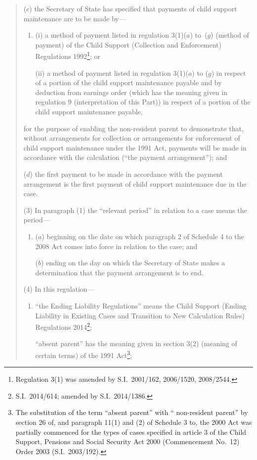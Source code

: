 \documentclass[12pt,a4paper]{article}
\begin{document}
\begin{quotation}
\begin{enumerate}
    ($c$)
    the Secretary of State has specified that payments of child support maintenance are to be made by—
\begin{enumerate}\item[]
    (i)
    a method of payment listed in regulation 3(1)($a$) to~($g$) (method of payment) of the Child Support (Collection and Enforcement) Regulations 1992\footnote{Regulation 3(1) was amended by S.I.~2001/162, 2006/1520, 2008/2544.}; or

    (ii)
    a method of payment listed in regulation 3(1)($a$) to ($g$) in respect of a portion of the child support maintenance payable and by deduction from earnings order (which has the meaning given in regulation 9 (interpretation of this Part)) in respect of a portion of the child support maintenance payable,
\end{enumerate}
    for the purpose of enabling the non-resident parent to demonstrate that, without arrangements for collection or arrangements for enforcement of child support maintenance under the 1991 Act, payments will be made in accordance with the calculation (“the payment arrangement”); and

    ($d$)
    the first payment to be made in accordance with the payment arrangement is the first payment of child support maintenance due in the case.
\end{enumerate}

    (3)
    In paragraph (1) the “relevant period” in relation to a case means the period—
\begin{enumerate}\item[]
    ($a$)
    beginning on the date on which paragraph 2 of Schedule 4 to the 2008 Act comes into force in relation to the case; and

    ($b$)
    ending on the day on which the Secretary of State makes a determination that the payment arrangement is to end.
\end{enumerate}

    (4)
    In this regulation—
\begin{enumerate}\item[]
        “the Ending Liability Regulations” means the Child Support (Ending Liability in Existing Cases and Transition to New Calculation Rules) Regulations 2014\footnote{S.I.~2014/614; amended by S.I.~2014/1386.};

        “absent parent” has the meaning given in section 3(2) (meaning of certain terms) of the 1991 Act\footnote{The substitution of the term “absent parent” with “ non-resident parent” by section 26 of, and paragraph 11(1) and (2) of Schedule 3 to, the 2000 Act was partially commenced for the types of cases specified in article 3 of the Child Support, Pensions and Social Security Act 2000 (Commencement No.~12) Order 2003 (S.I.~2003/192).};


\end{enumerate}
\end{quotation}
\end{document}
